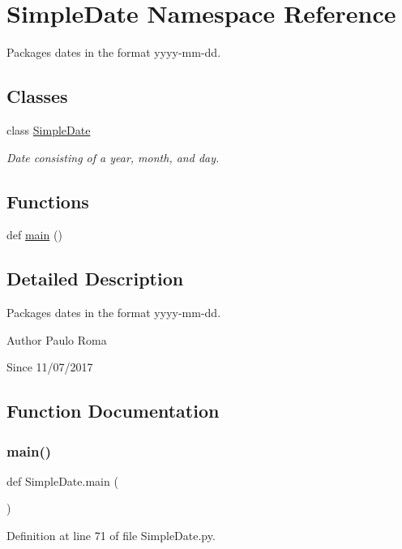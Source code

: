 \hypertarget{namespaceSimpleDate}{}\section{Simple\+Date Namespace Reference}
\label{namespaceSimpleDate}


Packages dates in the format yyyy-\/mm-\/dd.  


\subsection*{Classes}
\begin{DoxyCompactItemize}
\item 
class \hyperlink{classSimpleDate_1_1SimpleDate}{Simple\+Date}
\begin{DoxyCompactList}\small\item\em Date consisting of a year, month, and day. \end{DoxyCompactList}\end{DoxyCompactItemize}
\subsection*{Functions}
\begin{DoxyCompactItemize}
\item 
def \hyperlink{namespaceSimpleDate_ab140fefeaf1e771ff130ecde43e449af}{main} ()
\end{DoxyCompactItemize}


\subsection{Detailed Description}
Packages dates in the format yyyy-\/mm-\/dd. 

\begin{DoxyAuthor}{Author}
Paulo Roma 
\end{DoxyAuthor}
\begin{DoxySince}{Since}
11/07/2017 
\end{DoxySince}


\subsection{Function Documentation}
\mbox{\label{namespaceSimpleDate_ab140fefeaf1e771ff130ecde43e449af}} 
\subsubsection{\texorpdfstring{main()}{main()}}
{\footnotesize\ttfamily def Simple\+Date.\+main (\begin{DoxyParamCaption}{ }\end{DoxyParamCaption})}



Definition at line 71 of file Simple\+Date.\+py.

